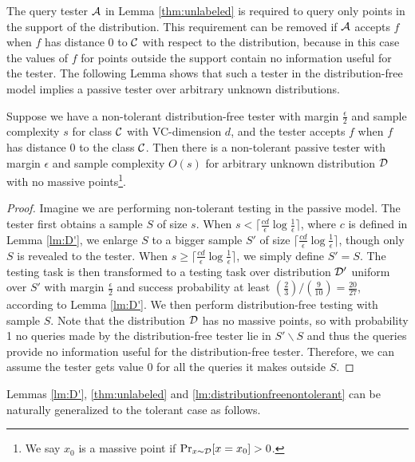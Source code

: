 The query tester ${\mathcal{A}}$ in Lemma \ref{thm:unlabeled} is required to query only points in the support of the distribution. This requirement can be removed if ${\mathcal{A}}$ accepts $f$ when $f$ has distance 0 to ${\mathcal{C}}$ with respect to the distribution, because in this case the values of $f$ for points outside the support contain no information useful for the tester. The following Lemma shows that such a tester in the distribution-free model implies a passive tester over arbitrary unknown distributions.
\begin{lemma}
\label{lm:distributionfreenontolerant}
Suppose we have a non-tolerant distribution-free tester with margin $\frac{\epsilon}{2}$ and sample complexity $s$ for class ${\mathcal{C}}$ with VC-dimension $d$, and the tester accepts $f$ when $f$ has distance 0 to the class ${\mathcal{C}}$. Then there is a non-tolerant passive tester with margin $\epsilon$ and sample complexity $O(s)$ for arbitrary unknown distribution ${\mathcal{D}}$ with no massive points\footnote{We say $x_0$ is a massive point if $\Pr_{x\sim {\mathcal{D}}}[x=x_0]>0$.}.
\end{lemma}
\begin{proof}
Imagine we are performing non-tolerant testing in the passive model. The tester first obtains a sample $S$ of size $s$. When $s<\lceil\frac{cd}{\epsilon}\log\frac{1}{\epsilon}\rceil$, where $c$ is defined in Lemma \ref{lm:D'}, we enlarge $S$ to a bigger sample $S'$ of size $\lceil\frac{cd}{\epsilon}\log\frac{1}{\epsilon}\rceil$, though only $S$ is revealed to the tester. When $s\geq \lceil\frac{cd}{\epsilon}\log\frac{1}{\epsilon}\rceil$, we simply define $S'=S$. The testing task is then transformed to a testing task over distribution ${\mathcal{D}}'$ uniform over $S'$ with margin $\frac{\epsilon}{2}$ and success probability at least $(\frac 23)/(\frac 9{10})=\frac{20}{27}$, according to Lemma \ref{lm:D'}. We then perform distribution-free testing with sample $S$. Note that the distribution ${\mathcal{D}}$ has no massive points, so with probability 1 no queries made by the distribution-free tester lie in $S'\backslash S$ and thus the queries provide no information useful for the distribution-free tester. Therefore, we can assume the tester gets value 0 for all the queries it makes outside $S$.
\end{proof}

Lemmas \ref{lm:D'}, \ref{thm:unlabeled}  and \ref{lm:distributionfreenontolerant} can be naturally generalized to the tolerant case as follows.

